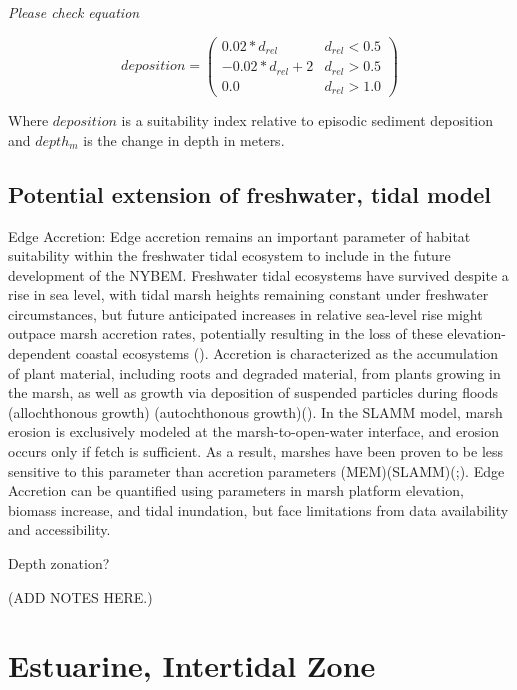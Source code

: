 \documentclass[
]{book}
\begin{document}
\emph{Please check equation}

\[deposition = \begin{pmatrix} 0.02*d_{rel} & d_{rel}<0.5\\
-0.02*d_{rel}+2 & d_{rel}>0.5\\
0.0 & d_{rel}>1.0
\end{pmatrix}\]

Where \(deposition\) is a suitability index relative to episodic sediment deposition and \(depth_{m}\) is the change in depth in meters.

\hypertarget{potential-extension-of-freshwater-tidal-model}{%
\subsection{Potential extension of freshwater, tidal model}\label{potential-extension-of-freshwater-tidal-model}}

Edge Accretion: Edge accretion remains an important parameter of habitat suitability within the freshwater tidal ecosystem to include in the future development of the NYBEM. Freshwater tidal ecosystems have survived despite a rise in sea level, with tidal marsh heights remaining constant under freshwater circumstances, but future anticipated increases in relative sea-level rise might outpace marsh accretion rates, potentially resulting in the loss of these elevation-dependent coastal ecosystems (\citet{schile_modeling_2014}). Accretion is characterized as the accumulation of plant material, including roots and degraded material, from plants growing in the marsh, as well as growth via deposition of suspended particles during floods (allochthonous growth) (autochthonous growth)(\citet{schile_modeling_2014}).
In the SLAMM model, marsh erosion is exclusively modeled at the marsh-to-open-water interface, and erosion occurs only if fetch is sufficient. As a result, marshes have been proven to be less sensitive to this parameter than accretion parameters (MEM)(SLAMM)(\citet{morris_responses_2002};\citet{propato_evaluating_2018}). Edge Accretion can be quantified using parameters in marsh platform elevation, biomass increase, and tidal inundation, but face limitations from data availability and accessibility.

Depth zonation?

({ADD NOTES HERE.})

\hypertarget{estuarine-intertidal-zone}{%
\section{Estuarine, Intertidal Zone}\label{estuarine-intertidal-zone}}
\end{document}
